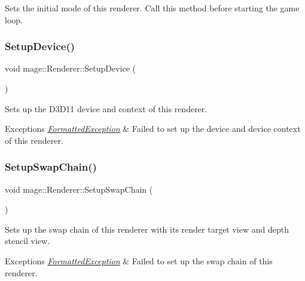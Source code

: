 Sets the initial mode of this renderer. Call this method before starting the game loop. \hypertarget{classmage_1_1_renderer_aedf5e2e3f73d3d05c09c5fc9f8ac06c3}{}\label{classmage_1_1_renderer_aedf5e2e3f73d3d05c09c5fc9f8ac06c3} 
\subsubsection{\texorpdfstring{Setup\+Device()}{SetupDevice()}}
{\footnotesize\ttfamily void mage\+::\+Renderer\+::\+Setup\+Device (\begin{DoxyParamCaption}{ }\end{DoxyParamCaption})\hspace{0.3cm}{\ttfamily [private]}}

Sets up the D3\+D11 device and context of this renderer.


\begin{DoxyExceptions}{Exceptions}
{\em \hyperlink{structmage_1_1_formatted_exception}{Formatted\+Exception}} & Failed to set up the device and device context of this renderer. \\
\hline
\end{DoxyExceptions}
\hypertarget{classmage_1_1_renderer_a8d3030611390f69120f1e5b91225eddf}{}\label{classmage_1_1_renderer_a8d3030611390f69120f1e5b91225eddf} 
\subsubsection{\texorpdfstring{Setup\+Swap\+Chain()}{SetupSwapChain()}}
{\footnotesize\ttfamily void mage\+::\+Renderer\+::\+Setup\+Swap\+Chain (\begin{DoxyParamCaption}{ }\end{DoxyParamCaption})\hspace{0.3cm}{\ttfamily [private]}}

Sets up the swap chain of this renderer with its render target view and depth stencil view.


\begin{DoxyExceptions}{Exceptions}
{\em \hyperlink{structmage_1_1_formatted_exception}{Formatted\+Exception}} & Failed to set up the swap chain of this renderer. \\
\hline
\end{DoxyExceptions}
\hypertarget{classmage_1_1_renderer_a9004ab608659188900c808eacb5f873c}{}\label{classmage_1_1_renderer_a9004ab608659188900c808eacb5f873c} 
